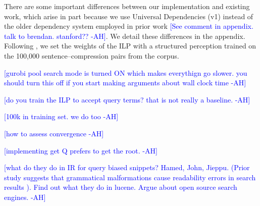 \documentclass[11pt,a4paper]{article}
\newcommand{\ahcomment}[1]{\textcolor{blue}{[#1 -AH]}}
\begin{document}
There are some important differences between our implementation and existing work, which arise in part because we use Universal Dependencies (v1) instead of the older dependency system employed in prior work \ahcomment{See comment in appendix. talk to brendan. stanford??}. We detail these differences in the appendix. Following \citet{filippova2013overcoming}, we set the weights of the ILP with a structured perception trained on the 100,000 sentence--compression pairs from the corpus.

\ahcomment{gurobi pool search mode is turned ON which makes everythign go slower. you should turn this off if you start making arguments about wall clock time}

\ahcomment{do you train the ILP to accept query terms? that is not really a baseline. }

\ahcomment{100k in training set. we do too }

\ahcomment{how to assess convergence}

\ahcomment{implementing get Q prefers to get the root. }


\ahcomment{what do they do in IR for query biased snippets? Hamed, John, Jieppu.
 (Prior study suggests that grammatical malformations cause readability errors in search results \cite{kanungo2009predicting}).
 Find out what they do in lucene. Argue about open source search engines. }
\end{document}
